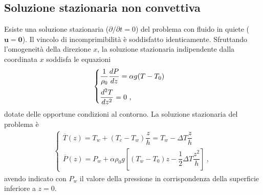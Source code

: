 \documentclass[letterpaper,10pt,italian]{jupyterBook}
\begin{document}
\subsection{Soluzione stazionaria non convettiva}
\label{\detokenize{polimi/fluidmechanics-ita/template/capitoli/07_similitudine/07teoria:soluzione-stazionaria-non-convettiva}}
\sphinxAtStartPar
Esiste una soluzione stazionaria (\(\partial / \partial t = 0\)) del
problema con fluido in quiete (\(\mathbf{u} = \mathbf{0}\)). Il vincolo di
incomprimibilità è soddisfatto identicamente. Sfruttando l’omogeneità
della direzione \(x\), la soluzione stazionaria indipendente dalla
coordinata \(x\) soddisfa le equazioni
\begin{equation*}
\begin{split}\begin{cases}
        \dfrac{1}{\rho_0}\dfrac{d P}{d z} = \alpha g (T-T_0)  \vspace{0.2cm} \\
        \dfrac{d^2 T}{d z^2} = 0 \ ,
    \end{cases}\end{split}
\end{equation*}
\sphinxAtStartPar
dotate delle opportune condizioni al contorno. La
soluzione stazionaria del problema è
\begin{equation*}
\begin{split}\begin{cases}
    \overline{T}(z) = T_w + (T_c-T_w) \dfrac{z}{h} =
    T_w - \Delta T \dfrac{z}{h} \\
    \overline{P}(z) = P_w + \alpha \rho_0 g \left[ (T_w-T_0) z
    - \dfrac{1}{2} \Delta T \dfrac{z^2}{h} \right] \ ,
\end{cases}\end{split}
\end{equation*}
\sphinxAtStartPar
avendo indicato con \(P_w\) il valore della pressione in
corrispondenza della superficie inferiore a \(z = 0\).
\end{document}
